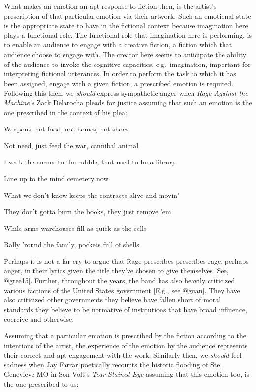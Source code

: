 \documentclass[
  letterpaper,
  DIV=11,
  numbers=noendperiod]{scrartcl}
\theoremstyle{remark}
\begin{document}
What makes an emotion an apt response to fiction then, is the artist's
prescription of that particular emotion via their artwork. Such an
emotional state is the appropriate state to have in the fictional
context because imagination here plays a functional role. The functional
role that imagination here is performing, is to enable an audience to
engage with a creative fiction, a fiction which that audience choose to
engage with. The creator here seems to anticipate the ability of the
audience to invoke the cognitive capacities, e.g.~imagination, important
for interpreting fictional utterances. In order to perform the task to
which it has been assigned, engage with a given fiction, a prescribed
emotion is required. Following this then, we \emph{should} express
sympathetic anger when \emph{Rage Against the Machine's} Zack Delarocha
pleads for justice assuming that such an emotion is the one prescribed
in the context of his plea:

Weapons, not food, not homes, not shoes

Not need, just feed the war, cannibal animal

I walk the corner to the rubble, that used to be a library

Line up to the mind cemetery now

What we don't know keeps the contracts alive and movin'

They don't gotta burn the books, they just remove 'em

While arms warehouses fill as quick as the cells

Rally 'round the family, pockets full of shells

\noindent Perhaps it is not a far cry to argue that Rage prescribes
prescribes rage, perhaps anger, in their lyrics given the title they've
chosen to give themselves {[}See, @gree15{]}. Further, throughout the
years, the band has also heavily criticized various factions of the
United States government {[}E.g., see @guan{]}. They have also
criticized other governments they believe have fallen short of moral
standards they believe to be normative of institutions that have broad
influence, coercive and otherwise.

Assuming that a particular emotion is prescribed by the fiction
according to the intentions of the artist, the experience of the emotion
by the audience represents their correct and apt engagement with the
work. Similarly then, we \emph{should} feel sadness when Jay Farrar
poetically recounts the historic flooding of Ste. Genevieve MO in Son
Volt's \emph{Tear Stained Eye} assuming that this emotion too, is the
one prescribed to us:
\end{document}
